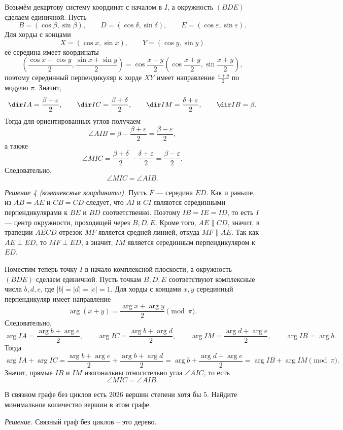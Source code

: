 Возьмём декартову систему координат с началом в \(I\), а окружность \((BDE)\) сделаем единичной. Пусть
\[
B=(\cos\beta,\sin\beta),\qquad D=(\cos\delta,\sin\delta),\qquad E=(\cos\varepsilon,\sin\varepsilon).
\]
Для хорды с концами
\[
X=(\cos x,\sin x),\qquad Y=(\cos y,\sin y)
\]
её середина имеет координаты
\[
\left(\frac{\cos x+\cos y}{2},\frac{\sin x+\sin y}{2}\right)
=\cos\frac{x-y}{2}\left(\cos\frac{x+y}{2},\sin\frac{x+y}{2}\right),
\]
поэтому серединный перпендикуляр к хорде \(XY\) имеет направление \(\frac{x+y}{2}\) по модулю \(\pi\). Значит,
\[
\dir IA=\frac{\beta+\varepsilon}{2},\qquad
\dir IC=\frac{\beta+\delta}{2},\qquad
\dir IM=\frac{\delta+\varepsilon}{2},\qquad
\dir IB=\beta.
\]
Тогда для ориентированных углов получаем
\[
\angle AIB=\beta-\frac{\beta+\varepsilon}{2}=\frac{\beta-\varepsilon}{2},
\]
а также
\[
\angle MIC=\frac{\beta+\delta}{2}-\frac{\delta+\varepsilon}{2}=\frac{\beta-\varepsilon}{2}.
\]
Следовательно,
\[
\angle MIC=\angle AIB.
\]

\textit{Решение 4 (комплексные координаты).}
Пусть \(F\) --- середина \(ED\). Как и раньше, из \(AB=AE\) и \(CB=CD\) следует, что \(AI\) и \(CI\) являются серединными перпендикулярами к \(BE\) и \(BD\) соответственно. Поэтому \(IB=IE=ID\), то есть \(I\) --- центр окружности, проходящей через \(B,D,E\). Кроме того, \(AE\parallel CD\), значит, в трапеции \(AECD\) отрезок \(MF\) является средней линией, откуда \(MF\parallel AE\). Так как \(AE\perp ED\), то \(MF\perp ED\), а значит, \(IM\) является серединным перпендикуляром к \(ED\).

Поместим теперь точку \(I\) в начало комплексной плоскости, а окружность \((BDE)\) сделаем единичной. Пусть точкам \(B,D,E\) соответствуют комплексные числа \(b,d,e\), где \(|b|=|d|=|e|=1\). Для хорды с концами \(x,y\) серединный перпендикуляр имеет направление
\[
\arg(x+y)=\frac{\arg x+\arg y}{2}\pmod\pi.
\]
Следовательно,
\[
\arg IA=\frac{\arg b+\arg e}{2},\qquad 
\arg IC=\frac{\arg b+\arg d}{2},\qquad
\arg IM=\frac{\arg d+\arg e}{2},\qquad
\arg IB=\arg b .
\]
Тогда
\[
\arg IA+\arg IC
=\frac{\arg b+\arg e}{2}+\frac{\arg b+\arg d}{2}
=\arg b+\frac{\arg d+\arg e}{2}
=\arg IB+\arg IM \pmod\pi.
\]
Значит, прямые \(IB\) и \(IM\) изогональны относительно угла \(\angle AIC\), то есть
\[
\angle MIC=\angle AIB.
\]


В связном графе без циклов есть $2026$ вершин степени хотя бы $5$. Найдите минимальное количество вершин в этом графе.

\textit{Решение.}
Связный граф без циклов -- это дерево.

